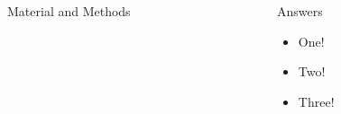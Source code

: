 \documentclass[gray]{subdocuments/open_science_poster}\usepackage{graphicx, color}
\begin{document}
\begin{frame}[t]
\begin{columns}[t]
\begin{column}{0.28\paperwidth}
			\begin{block}{Material and Methods}
				\lipsum[2]


			\end{block}

		\end{column}


		\begin{column}{0.28\paperwidth}

			\begin{alertblock}{Answers}
				\begin{itemize}
					\item One!
					\item Two!
					\item Three!
				\end{itemize}
			\end{alertblock}

			\begin{exampleblock}{}
				\lipsum[2-3]	
			\end{exampleblock}

		\end{column}  


	\end{columns}
\end{frame}
\end{document}
